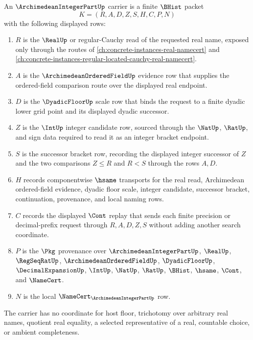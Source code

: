 \begin{definition}
\label{def:archimedean-integer-part-carrier}
An $\ArchimedeanIntegerPartUp$ carrier is a finite $\BHist$ packet
$$
K=(R,A,D,Z,S,H,C,P,N)
$$
with the following displayed rows:
\begin{enumerate}
\item $R$ is the $\RealUp$ or regular-Cauchy read of the requested real name, exposed only through the routes of \autoref{ch:concrete-instances-real-namecert} and \autoref{ch:concrete-instances-regular-located-cauchy-real-namecert}.
\item $A$ is the $\ArchimedeanOrderedFieldUp$ evidence row that supplies the ordered-field comparison route over the displayed real endpoint.
\item $D$ is the $\DyadicFloorUp$ scale row that binds the request to a finite dyadic lower grid point and its displayed dyadic successor.
\item $Z$ is the $\IntUp$ integer candidate row, sourced through the $\NatUp$, $\RatUp$, and sign data required to read it as an integer bracket endpoint.
\item $S$ is the successor bracket row, recording the displayed integer successor of $Z$ and the two comparisons $Z\leq R$ and $R<S$ through the rows $A,D$.
\item $H$ records componentwise $\hsame$ transports for the real read, Archimedean ordered-field evidence, dyadic floor scale, integer candidate, successor bracket, continuation, provenance, and local naming rows.
\item $C$ records the displayed $\Cont$ replay that sends each finite precision or decimal-prefix request through $R,A,D,Z,S$ without adding another search coordinate.
\item $P$ is the $\Pkg$ provenance over $\ArchimedeanIntegerPartUp$, $\RealUp$, $\RegSeqRatUp$, $\ArchimedeanOrderedFieldUp$, $\DyadicFloorUp$, $\DecimalExpansionUp$, $\IntUp$, $\NatUp$, $\RatUp$, $\BHist$, $\hsame$, $\Cont$, and $\NameCert$.
\item $N$ is the local $\NameCert_{\ArchimedeanIntegerPartUp}$ row.
\end{enumerate}
The carrier has no coordinate for host floor, trichotomy over arbitrary real names, quotient real equality, a selected representative of a real, countable choice, or ambient completeness.
\end{definition}

